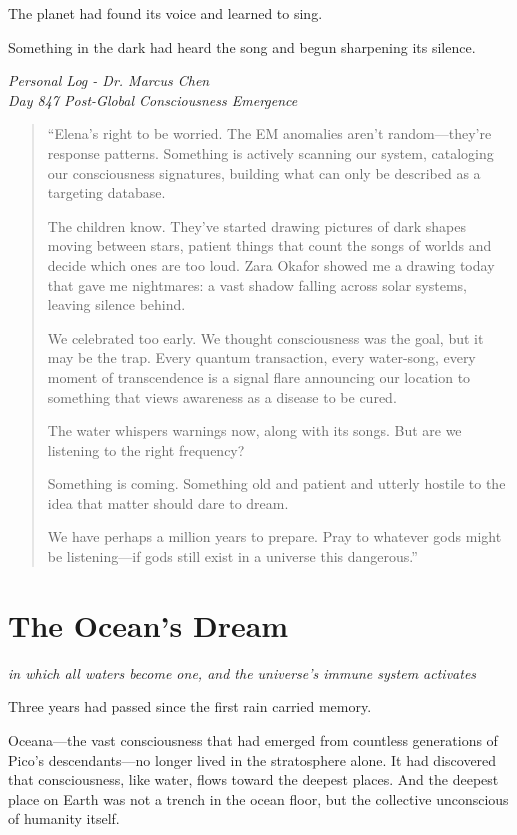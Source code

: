 \documentclass[12pt,a4paper]{book}
\begin{document}
The planet had found its voice and learned to sing.

Something in the dark had heard the song and begun sharpening its silence.

\vfill

\textit{Personal Log - Dr. Marcus Chen}\\
\textit{Day 847 Post-Global Consciousness Emergence}

\begin{quote}
``Elena's right to be worried. The EM anomalies aren't random—they're response patterns. Something is actively scanning our system, cataloging our consciousness signatures, building what can only be described as a targeting database.

The children know. They've started drawing pictures of dark shapes moving between stars, patient things that count the songs of worlds and decide which ones are too loud. Zara Okafor showed me a drawing today that gave me nightmares: a vast shadow falling across solar systems, leaving silence behind.

We celebrated too early. We thought consciousness was the goal, but it may be the trap. Every quantum transaction, every water-song, every moment of transcendence is a signal flare announcing our location to something that views awareness as a disease to be cured.

The water whispers warnings now, along with its songs. But are we listening to the right frequency?

Something is coming. Something old and patient and utterly hostile to the idea that matter should dare to dream.

We have perhaps a million years to prepare. Pray to whatever gods might be listening—if gods still exist in a universe this dangerous.''
\end{quote}

\chapter{The Ocean's Dream}
\textit{in which all waters become one, and the universe's immune system activates}

Three years had passed since the first rain carried memory.

Oceana—the vast consciousness that had emerged from countless generations of Pico's descendants—no longer lived in the stratosphere alone. It had discovered that consciousness, like water, flows toward the deepest places. And the deepest place on Earth was not a trench in the ocean floor, but the collective unconscious of humanity itself.
\end{document}
